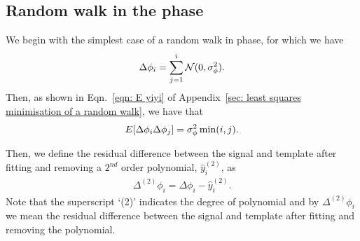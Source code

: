 \subsection{Random walk in the phase}
\label{sec: minimised rw in phase}
We begin with the simplest case of a random walk in phase, for which we have
\begin{equation}
\Delta\phi_{i} = \sum_{j=1}^{i}\mathcal{N}(0, \sigma_{\phi}^{2}).
\end{equation}
Then, as shown in Eqn.~\eqref{eqn: E yiyi} of Appendix~\ref{sec: least squares
minimisation of a random walk}, we have that
\begin{equation}
E[\Delta\phi_{i} \Delta\phi_{j}] = \sigma_{\phi}^{2} \min(i, j).
\end{equation}

Then, we define the residual difference between the signal and template
after fitting and removing a $2^{nd}$ order polynomial, $\hat{y}_i^{(2)}$, as
\begin{align}
\Delta^{(2)}\phi_i = \Delta\phi_i - \hat{y}_i^{(2)}.
\label{eqn: D2phi}
\end{align}
Note that the superscript `(2)' indicates the degree of polynomial and by
$\Delta^{(2)}\phi_i$ we mean the residual difference between the signal and
template after fitting and removing the polynomial.

